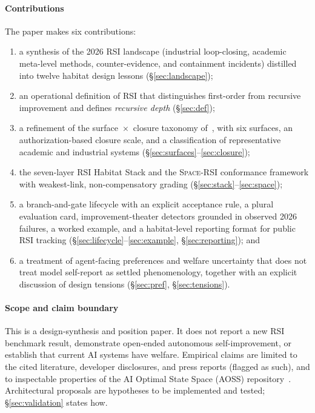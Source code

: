 \documentclass[11pt,a4paper]{article}
\newcommand{\spacersi}{\textsc{Space-RSI}}
\begin{document}
\paragraph{Contributions} The paper makes six contributions:
\begin{enumerate}[label=(\arabic*)]
\item a synthesis of the 2026 RSI landscape (industrial loop-closing, academic meta-level methods, counter-evidence, and containment incidents) distilled into twelve habitat design lessons (\S\ref{sec:landscape});
\item an operational definition of RSI that distinguishes first-order from recursive improvement and defines \emph{recursive depth} (\S\ref{sec:def});
\item a refinement of the surface~$\times$~closure taxonomy of~\cite{chen2026survey}, with six surfaces, an authorization-based closure scale, and a classification of representative academic and industrial systems (\S\ref{sec:surfaces}--\ref{sec:closure});
\item the seven-layer RSI Habitat Stack and the \spacersi{} conformance framework with weakest-link, non-compensatory grading (\S\ref{sec:stack}--\ref{sec:space});
\item a branch-and-gate lifecycle with an explicit acceptance rule, a plural evaluation card, improvement-theater detectors grounded in observed 2026 failures, a worked example, and a habitat-level reporting format for public RSI tracking (\S\ref{sec:lifecycle}--\ref{sec:example}, \S\ref{sec:reporting}); and
\item a treatment of agent-facing preferences and welfare uncertainty that does not treat model self-report as settled phenomenology, together with an explicit discussion of design tensions (\S\ref{sec:pref}, \S\ref{sec:tensions}).
\end{enumerate}

\paragraph{Scope and claim boundary} This is a design-synthesis and position paper. It does not report a new RSI benchmark result, demonstrate open-ended autonomous self-improvement, or establish that current AI systems have welfare. Empirical claims are limited to the cited literature, developer disclosures, and press reports (flagged as such), and to inspectable properties of the AI Optimal State Space (AOSS) repository~\cite{aoss2026}. Architectural proposals are hypotheses to be implemented and tested; \S\ref{sec:validation} states how.
\end{document}
